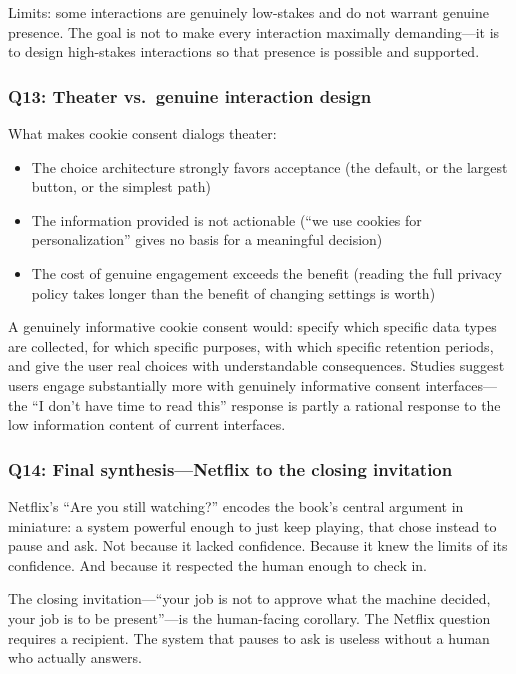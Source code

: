 Limits: some interactions are genuinely low-stakes and do not warrant genuine presence. The goal is not to make every interaction maximally demanding---it is to design high-stakes interactions so that presence is possible and supported.

\subsubsection*{Q13: Theater vs.\ genuine interaction design}

What makes cookie consent dialogs theater:
\begin{itemize}
    \item The choice architecture strongly favors acceptance (the default, or the largest button, or the simplest path)
    \item The information provided is not actionable (``we use cookies for personalization'' gives no basis for a meaningful decision)
    \item The cost of genuine engagement exceeds the benefit (reading the full privacy policy takes longer than the benefit of changing settings is worth)
\end{itemize}

A genuinely informative cookie consent would: specify which specific data types are collected, for which specific purposes, with which specific retention periods, and give the user real choices with understandable consequences. Studies suggest users engage substantially more with genuinely informative consent interfaces---the ``I don't have time to read this'' response is partly a rational response to the low information content of current interfaces.

\subsubsection*{Q14: Final synthesis---Netflix to the closing invitation}

Netflix's ``Are you still watching?'' encodes the book's central argument in miniature: a system powerful enough to just keep playing, that chose instead to pause and ask. Not because it lacked confidence. Because it knew the limits of its confidence. And because it respected the human enough to check in.

The closing invitation---``your job is not to approve what the machine decided, your job is to be present''---is the human-facing corollary. The Netflix question requires a recipient. The system that pauses to ask is useless without a human who actually answers.

